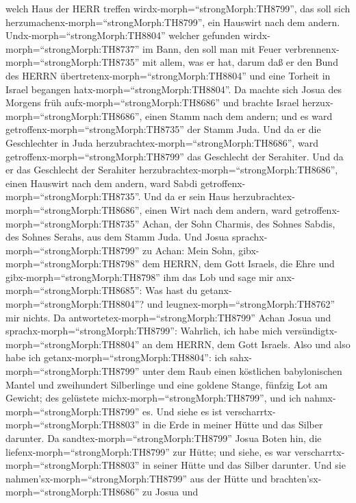 welch Haus der HERR treffen wirdx-morph=``strongMorph:TH8799'', das soll
sich herzumachenx-morph=``strongMorph:TH8799'', ein Hauswirt nach dem
andern.  Undx-morph=``strongMorph:TH8804'' welcher gefunden
wirdx-morph=``strongMorph:TH8737'' im Bann, den soll man mit Feuer
verbrennenx-morph=``strongMorph:TH8735'' mit allem, was er hat, darum
daß er den Bund des HERRN übertretenx-morph=``strongMorph:TH8804'' und
eine Torheit in Israel begangen hatx-morph=``strongMorph:TH8804''.
 Da machte sich Josua des Morgens früh
aufx-morph=``strongMorph:TH8686'' und brachte Israel
herzux-morph=``strongMorph:TH8686'', einen Stamm nach dem andern; und es
ward getroffenx-morph=``strongMorph:TH8735'' der Stamm Juda.
 Und da er die Geschlechter in Juda
herzubrachtex-morph=``strongMorph:TH8686'', ward
getroffenx-morph=``strongMorph:TH8799'' das Geschlecht der Serahiter.
Und da er das Geschlecht der Serahiter
herzubrachtex-morph=``strongMorph:TH8686'', einen Hauswirt nach dem
andern, ward Sabdi getroffenx-morph=``strongMorph:TH8735''.
 Und da er sein Haus
herzubrachtex-morph=``strongMorph:TH8686'', einen Wirt nach dem andern,
ward getroffenx-morph=``strongMorph:TH8735'' Achan, der Sohn Charmis,
des Sohnes Sabdis, des Sohnes Serahs, aus dem Stamm Juda. 
Und Josua sprachx-morph=``strongMorph:TH8799'' zu Achan: Mein Sohn,
gibx-morph=``strongMorph:TH8798'' dem HERRN, dem Gott Israels, die Ehre
und gibx-morph=``strongMorph:TH8798'' ihm das Lob und sage mir
anx-morph=``strongMorph:TH8685'': Was hast du
getanx-morph=``strongMorph:TH8804''? und
leugnex-morph=``strongMorph:TH8762'' mir nichts.  Da
antwortetex-morph=``strongMorph:TH8799'' Achan Josua und
sprachx-morph=``strongMorph:TH8799'': Wahrlich, ich habe mich
versündigtx-morph=``strongMorph:TH8804'' an dem HERRN, dem Gott Israels.
Also und also habe ich getanx-morph=``strongMorph:TH8804'':
 ich sahx-morph=``strongMorph:TH8799'' unter dem Raub einen
köstlichen babylonischen Mantel und zweihundert Silberlinge und eine
goldene Stange, fünfzig Lot am Gewicht; des gelüstete
michx-morph=``strongMorph:TH8799'', und ich
nahmx-morph=``strongMorph:TH8799'' es. Und siehe es ist
verscharrtx-morph=``strongMorph:TH8803'' in die Erde in meiner Hütte und
das Silber darunter.  Da
sandtex-morph=``strongMorph:TH8799'' Josua Boten hin, die
liefenx-morph=``strongMorph:TH8799'' zur Hütte; und siehe, es war
verscharrtx-morph=``strongMorph:TH8803'' in seiner Hütte und das Silber
darunter.  Und sie nahmen'sx-morph=``strongMorph:TH8799''
aus der Hütte und brachten'sx-morph=``strongMorph:TH8686'' zu Josua und

